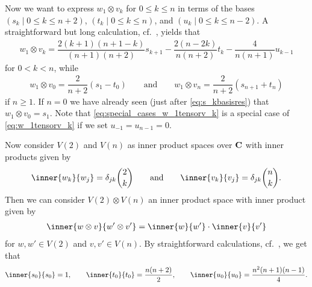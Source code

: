 Now we want to express $w_1\otimes v_k$ for $0\leq k\leq n$ in terms of the bases $(s_k \mid 0\leq k\leq n+2)$, $(t_k \mid 0\leq k\leq n)$, and $(u_k \mid 0\leq k\leq n-2)$. A straightforward but long calculation, cf.\ , yields that
\begin{align}\label{eq:w_1tensorv_k}
  w_1\otimes v_k = \dfrac{2(k+1)(n+1-k)}{(n+1)(n+2)}s_{k+1} - \dfrac{2(n-2k)}{n(n+2)}t_k - \dfrac{4}{n(n+1)}u_{k-1}
\end{align}
for $0<k<n$, while
\begin{align}\label{eq:special_cases_w_1tensorv_k}
  w_1\otimes v_0 = \dfrac{2}{n+2}(s_1-t_0) \qquad \mbox{and} \qquad w_1\otimes v_n = \dfrac{2}{n+2}(s_{n+1}+t_n)
\end{align}
if $n\geq 1$. If $n=0$ we have already seen (just after \cref{eq:s_kbasisres}) that $w_1\otimes v_0 = s_1$. Note that \cref{eq:special_cases_w_1tensorv_k} is a special case of \cref{eq:w_1tensorv_k} if we set $u_{-1}=u_{n-1}=0$.

Now consider $V(2)$ and $V(n)$ as inner product spaces over $\mathbf{C}$ with inner products given by
\begin{align}\label{eq:inproddef1}
  \inner{w_k}{w_j} = \delta_{jk} \binom{2}{k} \qquad \mbox{and} \qquad \inner{v_k}{v_j} = \delta_{jk}\binom{n}{k}.
\end{align}
Then we can consider $V(2)\otimes V(n)$ an inner product space with inner product given by
\begin{align}\label{eq:inproddef2}
  \inner{w\otimes v}{w'\otimes v'} = \inner{w}{w'}\cdot\inner{v}{v'}
\end{align}
for $w,w'\in V(2)$ and $v,v'\in V(n)$. By straightforward calculations, cf.\ , we get that
\begin{align}\label{eq:inprodres}
  \inner{s_0}{s_0} = 1, \qquad \inner{t_0}{t_0} = \dfrac{n(n+2)}{2}, \qquad \inner{u_0}{u_0} = \dfrac{n^2(n+1)(n-1)}{4}.
\end{align}

